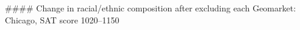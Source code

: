 #### Change in racial/ethnic composition after excluding each Geomarket: Chicago, SAT score 1020–1150
